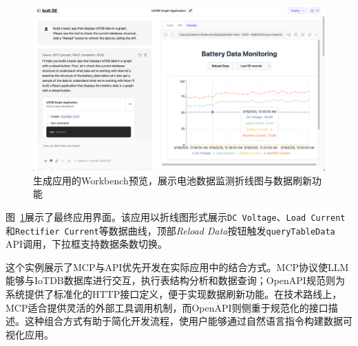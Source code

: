 \begin{figure}
  \centering
  \includegraphics[width=\textwidth,height=0.75\textheight,keepaspectratio]{figures/screenshots/iotdb-demo/app-preview.png}
  \caption{生成应用的Workbench预览，展示电池数据监测折线图与数据刷新功能}
  \label{fig:app-preview}
\end{figure}

图~\ref{fig:app-preview}展示了最终应用界面。该应用以折线图形式展示\texttt{DC Voltage}、\texttt{Load Current}和\texttt{Rectifier Current}等数据曲线，顶部\textit{Reload Data}按钮触发\texttt{queryTableData} API调用，下拉框支持数据条数切换。

这个实例展示了MCP与API优先开发在实际应用中的结合方式。MCP协议使LLM能够与IoTDB数据库进行交互，执行表结构分析和数据查询；OpenAPI规范则为系统提供了标准化的HTTP接口定义，便于实现数据刷新功能。在技术路线上，MCP适合提供灵活的外部工具调用机制，而OpenAPI则侧重于规范化的接口描述。这种组合方式有助于简化开发流程，使用户能够通过自然语言指令构建数据可视化应用。